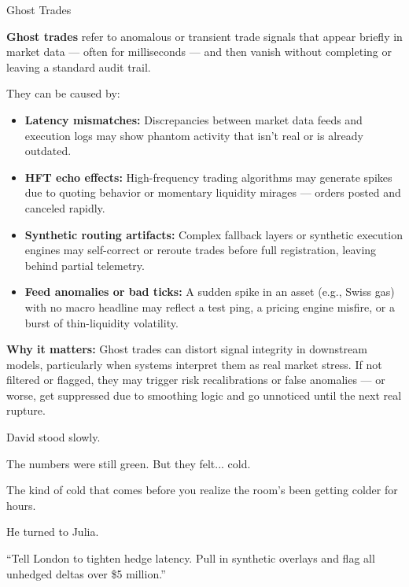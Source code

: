\begin{TechnicalSidebar}{Ghost Trades}

  \textbf{Ghost trades} refer to anomalous or transient trade signals that appear briefly in market data — 
  often for milliseconds — and then vanish without completing or leaving a standard audit trail.
  
  \medskip

  They can be caused by:

  \medskip

  \begin{itemize}
    \item \textbf{Latency mismatches:} Discrepancies between market data feeds and execution logs may show phantom 
    activity that isn't real or is already outdated.
    \item \textbf{HFT echo effects:} High-frequency trading algorithms may generate spikes due to quoting behavior 
    or momentary liquidity mirages — orders posted and canceled rapidly.
    \item \textbf{Synthetic routing artifacts:} Complex fallback layers or synthetic execution engines may 
    self-correct or reroute trades before full registration, leaving behind partial telemetry.
    \item \textbf{Feed anomalies or bad ticks:} A sudden spike in an asset (e.g., Swiss gas) with no macro headline 
    may reflect a test ping, a pricing engine misfire, or a burst of thin-liquidity volatility.
  \end{itemize}
  
  \medskip
  
  \textbf{Why it matters:} Ghost trades can distort signal integrity in downstream models, particularly when systems 
  interpret them as real market stress. If not filtered or flagged, they may trigger risk recalibrations or false anomalies — or worse, get suppressed due to smoothing logic and go unnoticed until the next real rupture.
  
\end{TechnicalSidebar}

David stood slowly.

The numbers were still green.  But they felt... cold.

The kind of cold that comes before you realize the room’s been getting colder for hours.

He turned to Julia.

“Tell London to tighten hedge latency. Pull in synthetic overlays and flag all unhedged deltas over \$5 million.”

